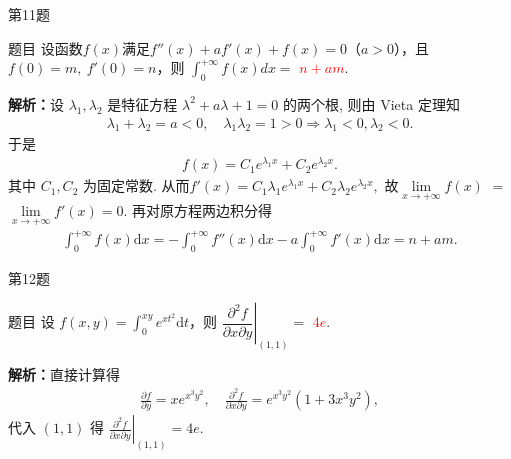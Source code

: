 \documentclass[aspectratio=169]{beamer}
\begin{document}
\begin{frame}{第11题}
\begin{block}{题目}
设函数$f(x)$满足$f''(x)+a f'(x)+f(x)=0$（$a>0$），且$f(0)=m,\ f'(0)=n$，则 $\displaystyle\int_0^{+\infty}f(x)dx=$ \underline{\textcolor{red}{$n+am$}}.
\end{block}
\textbf{解析：}设 $\lambda_1,\lambda_2$ 是特征方程 $\lambda^2+a\lambda+1=0$ 的两个根, 则由 Vieta 定理知
\begin{align*}
\lambda_1+\lambda_2=a<0,\quad \lambda_1\lambda_2=1>0\Longrightarrow \lambda_1<0,\lambda_2<0.
\end{align*}
于是
\begin{align*}
f(x)=C_1e^{\lambda_1x}+C_2e^{\lambda_2x}.
\end{align*}
其中 $C_1,C_2$ 为固定常数.
从而$f'(x)=C_1\lambda_1e^{\lambda_1x}+C_2\lambda_2e^{\lambda_2x},$
故$\lim\limits_{x\to+\infty}f(x)$ $=$ $\lim\limits_{x\to+\infty}f'(x)=0.$
再对原方程两边积分得
\begin{align*}
\int_0^{+\infty}f(x)\mathrm{d}x=-\int_0^{+\infty}f''(x)\mathrm{d}x-a\int_0^{+\infty}f'(x)\mathrm{d}x=n+am.
\end{align*}
\end{frame}

\begin{frame}{第12题}
\begin{block}{题目}
设 $\displaystyle f(x,y)=\int_0^{xy} e^{xt^2}\mathrm{d}t$，则 $\left.\dfrac{\partial^2 f}{\partial x\partial y}\right|_{(1,1)}=$ \underline{\textcolor{red}{$4e$}}.
\end{block}
\textbf{解析：}直接计算得
\begin{align*}
\frac{\partial f}{\partial y}=xe^{x^3y^2},\quad \frac{\partial ^2f}{\partial x\partial y}=e^{x^3y^2}\left( 1+3x^3y^2 \right) ,
\end{align*}
代入 $(1,1)$ 得 $\left. \frac{\partial ^2f}{\partial x\partial y} \right|_{\left( 1,1 \right)}=4e$.
\end{frame}
\end{document}
